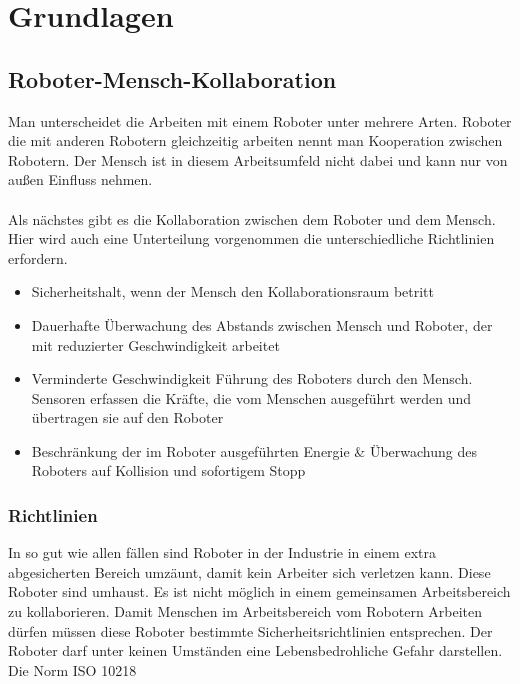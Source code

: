 \chapter{Grundlagen}

\section{Roboter-Mensch-Kollaboration}
\label{sec:roboter-mensch-kollaboration_gru}

Man unterscheidet die Arbeiten mit einem Roboter unter mehrere Arten.
Roboter die mit anderen Robotern gleichzeitig arbeiten nennt man Kooperation zwischen Robotern.
Der Mensch ist in diesem Arbeitsumfeld nicht dabei und kann nur von außen Einfluss nehmen.
\\\\
Als nächstes gibt es die Kollaboration zwischen dem Roboter und dem Mensch.
Hier wird auch eine Unterteilung vorgenommen die unterschiedliche Richtlinien erfordern.

\begin{itemize}
\item Sicherheitshalt, wenn der Mensch den Kollaborationsraum betritt
\item Dauerhafte Überwachung des Abstands zwischen Mensch und Roboter, der mit reduzierter Geschwindigkeit arbeitet
\item Verminderte Geschwindigkeit Führung des Roboters durch den Mensch. Sensoren erfassen die Kräfte, die vom Menschen ausgeführt werden und übertragen sie auf den Roboter
\item Beschränkung der im Roboter ausgeführten Energie \& Überwachung des Roboters auf Kollision und sofortigem Stopp
\end{itemize}

\subsection{Richtlinien}
\label{kol_richtlinien_gru}

In so gut wie allen fällen sind Roboter in der Industrie in einem extra abgesicherten Bereich umzäunt, damit kein Arbeiter sich verletzen kann. Diese Roboter sind umhaust. Es ist nicht möglich in einem gemeinsamen Arbeitsbereich zu kollaborieren.
Damit Menschen im Arbeitsbereich vom Robotern Arbeiten dürfen müssen diese Roboter bestimmte Sicherheitsrichtlinien entsprechen.
Der Roboter darf unter keinen Umständen eine Lebensbedrohliche Gefahr darstellen. Die Norm \ac{ISO} 10218

